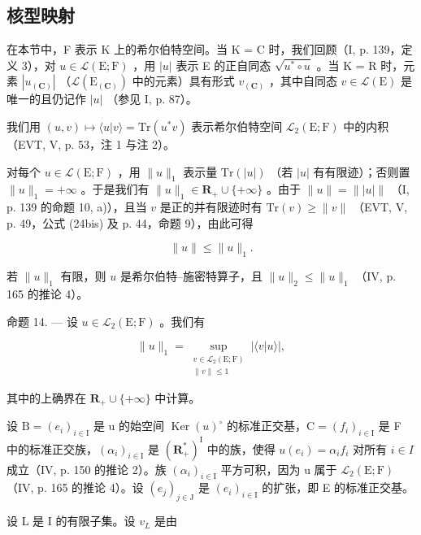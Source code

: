 \subsection{核型映射}

在本节中，F 表示 K 上的希尔伯特空间。当 K = C 时，我们回顾（I, p. 139，定义 3），对 \(u \in \mathcal{L}(\mathrm{E}; \mathrm{F})\) ，用 \(|u|\) 表示 E 的正自同态 \(\sqrt{u^{*} \circ u}\) 。当 K = R 时，元素 \(|u_{(\mathbf{C})}|\) （\(\mathcal{L}(\mathrm{E}_{(\mathbf{C})})\) 中的元素）具有形式 \(v_{(\mathbf{C})}\) ，其中自同态 \(v \in \mathcal{L}(\mathrm{E})\) 是唯一的且仍记作 \(|u|\) （参见 I, p. 87）。

我们用 \((u,v)\mapsto\langle u|v\rangle=\mathrm{Tr}(u^{*}v)\) 表示希尔伯特空间 \(\mathcal{L}_{2}(\mathrm{E};\mathrm{F})\) 中的内积（EVT, V, p. 53，注 1 与注 2）。

对每个 \(u \in \mathcal{L}(\mathrm{E};\mathrm{F})\) ，用 \(\| u\| _1\) 表示量 \(\mathrm{Tr}(|u|)\) （若 \(|u|\) 有有限迹）；否则置 \(\| u\| _1 = +\infty\) 。于是我们有 \(\| u\| _1 \in \mathbf{R}_+ \cup \{+\infty\}\) 。由于 \(\| u\| = \| |u|\|\) （I, p. 139 的命题 10, a)），且当 \(v\) 是正的并有限迹时有 \(\mathrm{Tr}(v) \geqslant \| v\|\) （EVT, V, p. 49，公式 (24bis) 及 p. 44，命题 9），由此可得

\[
\| u \| \leqslant \| u \| _ {1}.\tag{9}
\]

若 \(\| u\| _1\) 有限，则 \(u\) 是希尔伯特--施密特算子，且 \(\| u\| _2 \leqslant \| u\| _1\) （IV, p. 165 的推论 4）。

命题 14. --- 设 \(u \in \mathcal{L}_2(\mathrm{E};\mathrm{F})\) 。我们有

\[
\| u\|_{1} = \sup_{\substack{v\in \mathcal{L}_{2}(\mathrm{E};\mathrm{F})\\ \| v\| \leqslant 1}}|\langle v  |  u\rangle |,
\]

其中的上确界在 \(\mathbf{R}_{+} \cup \{+\infty\}\) 中计算。

设 \(\mathrm{B} = (e_i)_{i \in \mathrm{I}}\) 是 u 的始空间 \(\operatorname{Ker}(u)^{\circ}\) 的标准正交基，\(\mathrm{C} = (f_i)_{i \in \mathrm{I}}\) 是 F 中的标准正交族，\((\alpha_i)_{i \in \mathrm{I}}\) 是 \((\mathbf{R}_+^*)^{\mathrm{I}}\) 中的族，使得 \(u(e_i) = \alpha_i f_i\) 对所有 \(i \in I\) 成立（IV, p. 150 的推论 2）。族 \((\alpha_i)_{i \in \mathrm{I}}\) 平方可积，因为 u 属于 \(\mathcal{L}_2(\mathrm{E};\mathrm{F})\) （IV, p. 165 的推论 4）。设 \((e_j)_{j \in \mathrm{J}}\) 是 \((e_i)_{i \in \mathrm{I}}\) 的扩张，即 E 的标准正交基。

设 L 是 I 的有限子集。设 \(v_{L}\) 是由

